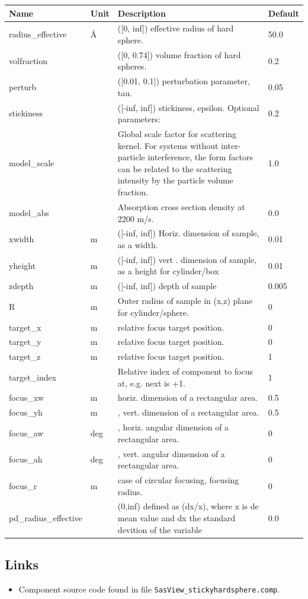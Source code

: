 \begin{longtable}{p{}p{}p{}p{}}
\toprule
\textbf{Name} & \textbf{Unit} & \textbf{Description} & \textbf{Default} \\
\midrule
\endhead
radius\_effective & \AA{} & ([0, inf]) effective radius of hard sphere. & 50.0 \\
volfraction &  & ([0, 0.74]) volume fraction of hard spheres. & 0.2 \\
perturb &  & ([0.01, 0.1]) perturbation parameter, tau. & 0.05 \\
stickiness &  & ([-inf, inf]) stickiness, epsilon. Optional parameters: & 0.2 \\
model\_scale &   & Global scale factor for scattering kernel. For systems without inter-particle interference, the form factors can be related to the scattering intensity by the particle volume fraction. & 1.0 \\
model\_abs &   & Absorption cross section density at 2200 m/s. & 0.0 \\
xwidth & m & ([-inf, inf]) Horiz. dimension of sample, as a width. & 0.01 \\
yheight & m & ([-inf, inf]) vert . dimension of sample, as a height for cylinder/box & 0.01 \\
zdepth & m & ([-inf, inf]) depth of sample & 0.005 \\
R & m & Outer radius of sample in (x,z) plane for cylinder/sphere. & 0 \\
target\_x & m & relative focus target position. & 0 \\
target\_y & m & relative focus target position. & 0 \\
target\_z & m & relative focus target position. & 1 \\
target\_index &   & Relative index of component to focus at, e.g. next is +1. & 1 \\
focus\_xw & m & horiz. dimension of a rectangular area. & 0.5 \\
focus\_yh & m & , vert. dimension of a rectangular area. & 0.5 \\
focus\_aw & deg & , horiz. angular dimension of a rectangular area. & 0 \\
focus\_ah & deg & , vert. angular dimension of a rectangular area. & 0 \\
focus\_r & m & case of circular focusing, focusing radius. & 0 \\
pd\_radius\_effective &  & (0,inf) defined as (dx/x), where x is de mean value and dx the standard devition of the variable & 0.0 \\
\bottomrule
\end{longtable}

\subsection*{Links}
\begin{itemize}
  \item Component source code found in file \texttt{SasView\_stickyhardsphere.comp}.
\end{itemize}
